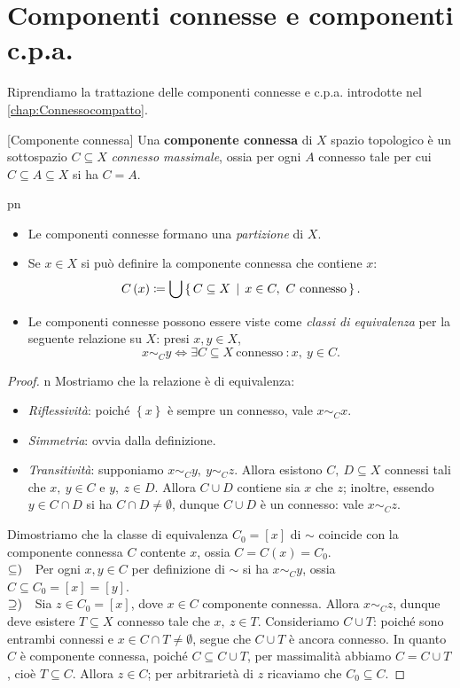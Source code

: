 \section{Componenti connesse e componenti c.p.a.}
Riprendiamo la trattazione delle componenti connesse e c.p.a. introdotte nel \autoref{chap:Connessocompatto}.
\begin{definition}{}[Componente connessa]
	Una \textbf{componente connessa} di $X$ spazio topologico è un sottospazio $C\subseteq X$ \textit{connesso massimale}, ossia per ogni $A$ connesso tale per cui $C\subseteq A\subseteq X$ si ha $C=A$.
\end{definition}
\begin{remark}{pn}~{}
\begin{itemize}
	\item Le componenti connesse formano una \textit{partizione} di $X$.
	\item Se $x\in X$ si può definire la componente connessa che contiene $x$:
	\begin{equation*}
		C\left(x\right)\coloneqq\bigcup\Set{C\subseteq X | x\in C,\ C\ \text{connesso}}.
	\end{equation*}
\item Le componenti connesse possono essere viste come \textit{classi di equivalenza} per la seguente relazione su $ X $: presi $x,y\in X$,
	\begin{equation*}
		x\sim_C y\iff \exists C\subseteq X\ \text{connesso}\ \colon x,\ y\in C.
	\end{equation*}
\end{itemize}
\end{remark}
\begin{proof}{n}
Mostriamo che la relazione è di equivalenza:
\begin{itemize}
\item \textit{Riflessività}: poiché $\left\{x\right\}$ è sempre un connesso, vale $x\sim_C x$.
\item \textit{Simmetria}: ovvia dalla definizione.
\item \textit{Transitività}: supponiamo $x\sim_C y,\ y\sim_C z$. Allora esistono $C,\ D\subseteq X$ connessi tali che $x,\ y\in C$ e $y,\ z\in D$. Allora $C\cup D$ contiene sia $x$ che $z$; inoltre, essendo $y\in C\cap D$ si ha $C\cap D\neq \emptyset$, dunque $C\cup D$ è un connesso: vale $x\sim_C z$.
\end{itemize}
Dimostriamo che la classe di equivalenza $C_0=\left[x\right]$ di $\sim$ coincide con la componente connessa $C$ contente $x$, ossia $C=C(x)=C_0$.\\
$\subseteq)\quad$Per ogni $x, y\in C$ per definizione di $\sim$ si ha $x\sim_C y$, ossia $C\subseteq C_0=[x]=[y]$.\\
$\supseteq)\quad$Sia $z\in C_0=\left[x\right]$, dove $x\in C$ componente connessa. Allora $x\sim_C z$, dunque deve esistere $T\subseteq X$ connesso tale che $x,\ z\in T$. Consideriamo $C\cup T$: poiché sono entrambi connessi e $x\in C\cap T \neq \emptyset$, segue che $C\cup T$ è ancora connesso. In quanto $C$ è componente connessa, poiché $C\subseteq C\cup T$, per massimalità abbiamo $C=C\cup T$, cioè $T\subseteq C$. Allora $z\in C$; per arbitrarietà di $z$ ricaviamo che $C_0\subseteq C$.\qedhere
\end{proof}

